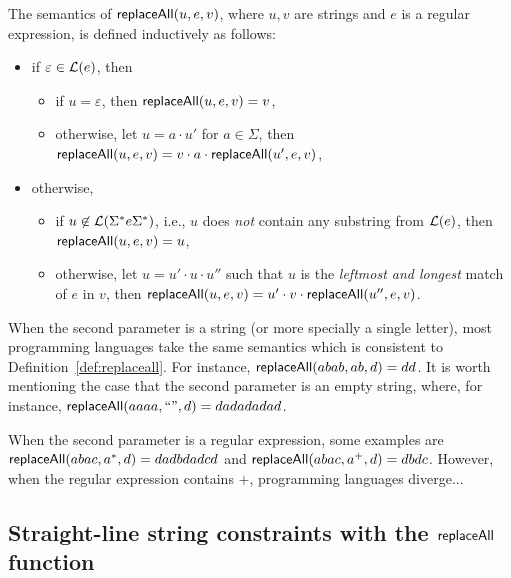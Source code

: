 \begin{definition} \label{def:replaceall}
The semantics of $\mathsf{replaceAll}(u, e, v)$, where $u, v$ are strings and $e$ is a regular expression, is defined inductively as follows:
\begin{itemize}
	\item if $\varepsilon \in \mathcal{L}(e)$, then
	\begin{itemize}
	\item if $u = \varepsilon$, then $\mathsf{replaceAll}(u,e, v) = v$,
	
	\item otherwise, let $u = a \cdot u'$ for $a \in \Sigma$, then $\mathsf{replaceAll}(u, e, v) =v \cdot a \cdot \mathsf{replaceAll}(u', e, v)$,
	\end{itemize}
%
	\item otherwise,
	\begin{itemize}
	\item if $u \not \in \mathcal{L}(\Sigma^\ast e \Sigma^\ast)$, i.e., $u$ does \emph{not} contain any substring from $\mathcal{L}(e)$, then $\mathsf{replaceAll}(u, e, v) = u$, 
	\item otherwise, let $u = u' \cdot u \cdot u''$ such that $u$ is the \emph{leftmost and longest} match of $e$ in $v$, then $\mathsf{replaceAll}(u, e, v) = u' \cdot v \cdot \mathsf{replaceAll}(u'', e, v)$.
	\end{itemize}
\end{itemize}
\end{definition}

\begin{example}
When the second parameter is a string (or more specially a single letter), most programming languages take the same semantics which is consistent to Definition~\ref{def:replaceall}. For instance,  $\mathsf{replaceAll}(abab, ab, d) =dd$. It is worth mentioning the case that the second parameter is an empty string, where, for instance,  $\mathsf{replaceAll}(aaaa, ``", d) =dadadadad$.

When the second parameter is a regular expression, some examples are $\mathsf{replaceAll}(abac, a^*, d) =d a d b d a d c d$ and $\mathsf{replaceAll}(abac, a^+, d)=dbdc$. However, when the regular expression contains $+$, programming languages diverge... 
\end{example}

\subsection{Straight-line string constraints with the $\mathsf{replaceAll}$ function}

